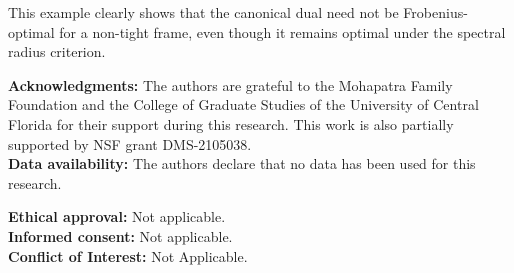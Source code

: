 \documentclass[final,1p,times]{elsarticle}
\begin{document}
\noindent
This example clearly shows that the canonical dual need not be Frobenius-optimal for a non-tight frame, even though it remains optimal under the spectral radius criterion.

		
		
		
		
		
		
		

















         \vspace{1cm}

	

	\noindent
	{\bf Acknowledgments:} 
	The authors are grateful to the Mohapatra Family Foundation and the College of Graduate Studies of the University of Central Florida for their support during this research. This work is also partially supported by NSF grant DMS-2105038.\\
    
    \noindent
	{\bf Data availability: } 
	The authors declare that no data has been used for this research.

\noindent
	{\bf Ethical approval: }  Not applicable.\\
\noindent
	{\bf Informed consent: } Not applicable.\\
\noindent
	{\bf Conflict of Interest:} Not Applicable.


 
\end{document}

